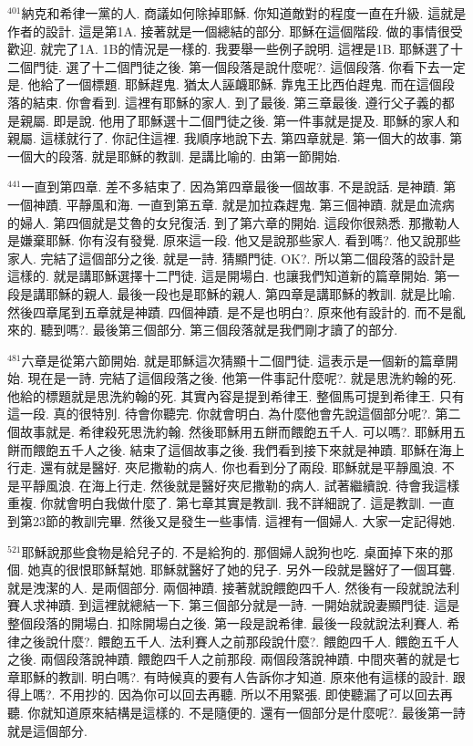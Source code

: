 \documentclass{book}
\begin{document}
$^{401}$納克和希律一黨的人.
商議如何除掉耶穌.
你知道敵對的程度一直在升級.
這就是作者的設計.
這是第1A.
接著就是一個總結的部分.
耶穌在這個階段.
做的事情很受歡迎.
就完了1A.
1B的情況是一樣的.
我要舉一些例子說明.
這裡是1B.
耶穌選了十二個門徒.
選了十二個門徒之後.
第一個段落是說什麼呢?.
這個段落.
你看下去一定是.
他給了一個標題.
耶穌趕鬼.
猶太人誣衊耶穌.
靠鬼王比西伯趕鬼.
而在這個段落的結束.
你會看到.
這裡有耶穌的家人.
到了最後.
第三章最後.
遵行父子義的都是親屬.
即是說.
他用了耶穌選十二個門徒之後.
第一件事就是提及.
耶穌的家人和親屬.
這樣就行了.
你記住這裡.
我順序地說下去.
第四章就是.
第一個大的故事.
第一個大的段落.
就是耶穌的教訓.
是講比喻的.
由第一節開始.

$^{441}$一直到第四章.
差不多結束了.
因為第四章最後一個故事.
不是說話.
是神蹟.
第一個神蹟.
平靜風和海.
一直到第五章.
就是加拉森趕鬼.
第三個神蹟.
就是血流病的婦人.
第四個就是艾魯的女兒復活.
到了第六章的開始.
這段你很熟悉.
那撒勒人是嫌棄耶穌.
你有沒有發覺.
原來這一段.
他又是說那些家人.
看到嗎?.
他又說那些家人.
完結了這個部分之後.
就是一詩.
猜顯門徒.
OK?.
所以第二個段落的設計是這樣的.
就是講耶穌選擇十二門徒.
這是開場白.
也讓我們知道新的篇章開始.
第一段是講耶穌的親人.
最後一段也是耶穌的親人.
第四章是講耶穌的教訓.
就是比喻.
然後四章尾到五章就是神蹟.
四個神蹟.
是不是也明白?.
原來他有設計的.
而不是亂來的.
聽到嗎?.
最後第三個部分.
第三個段落就是我們剛才讀了的部分.

$^{481}$六章是從第六節開始.
就是耶穌這次猜顯十二個門徒.
這表示是一個新的篇章開始.
現在是一詩.
完結了這個段落之後.
他第一件事記什麼呢?.
就是思洗約翰的死.
他給的標題就是思洗約翰的死.
其實內容是提到希律王.
整個馬可提到希律王.
只有這一段.
真的很特別.
待會你聽完.
你就會明白.
為什麼他會先說這個部分呢?.
第二個故事就是.
希律殺死思洗約翰.
然後耶穌用五餅而餵飽五千人.
可以嗎?.
耶穌用五餅而餵飽五千人之後.
結束了這個故事之後.
我們看到接下來就是神蹟.
耶穌在海上行走.
還有就是醫好.
夾尼撒勒的病人.
你也看到分了兩段.
耶穌就是平靜風浪.
不是平靜風浪.
在海上行走.
然後就是醫好夾尼撒勒的病人.
試著繼續說.
待會我這樣重複.
你就會明白我做什麼了.
第七章其實是教訓.
我不詳細說了.
這是教訓.
一直到第23節的教訓完畢.
然後又是發生一些事情.
這裡有一個婦人.
大家一定記得她.

$^{521}$耶穌說那些食物是給兒子的.
不是給狗的.
那個婦人說狗也吃.
桌面掉下來的那個.
她真的很恨耶穌幫她.
耶穌就醫好了她的兒子.
另外一段就是醫好了一個耳聾.
就是洩潔的人.
是兩個部分.
兩個神蹟.
接著就說餵飽四千人.
然後有一段就說法利賽人求神蹟.
到這裡就總結一下.
第三個部分就是一詩.
一開始就說妻顯門徒.
這是整個段落的開場白.
扣除開場白之後.
第一段是說希律.
最後一段就說法利賽人.
希律之後說什麼?.
餵飽五千人.
法利賽人之前那段說什麼?.
餵飽四千人.
餵飽五千人之後.
兩個段落說神蹟.
餵飽四千人之前那段.
兩個段落說神蹟.
中間夾著的就是七章耶穌的教訓.
明白嗎?.
有時候真的要有人告訴你才知道.
原來他有這樣的設計.
跟得上嗎?.
不用抄的.
因為你可以回去再聽.
所以不用緊張.
即使聽漏了可以回去再聽.
你就知道原來結構是這樣的.
不是隨便的.
還有一個部分是什麼呢?.
最後第一詩就是這個部分.
\end{document}
